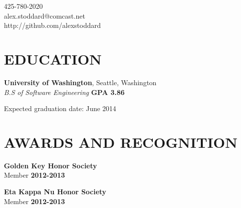 \documentclass[margin,line]{resume}
\begin{document}
{
    \sc
    \hfill 425-780-2020                   \vspace{0mm}\\\vspace{0mm}%
    \hfill alex.stoddard@comcast.net         \vspace{0mm}\\\vspace{0mm}%
    \hfill http://github.com/alexstoddard         \vspace{0mm}\\\vspace{0mm}%
}

\begin{resume}

    \section{\mysidestyle \textbf{\large{E}\small{DUCATION}}}

    \textbf{\listing University of Washington}, Seattle, Washington \vspace{2mm}\\\vspace{1mm}%
    \textsl{B.S of Software Engineering} \hfill \textbf{ GPA 3.86 }\vspace{-3mm}\\\vspace{-1mm}%
    \begin{list2}
        \item Expected graduation date: June 2014
    \end{list2}\vspace{-1.5mm}

\sectionline

    \section{\mysidestyle \textbf{\large{A}\small{WARDS AND RECOGNITION}}}

    \textbf{\listing Golden Key Honor Society}\\
    Member \hfill \textbf{2012-2013}

    \textbf{\listing Eta Kappa Nu Honor Society}\\
    Member \hfill \textbf{2012-2013}


\end{resume}
\end{document}
